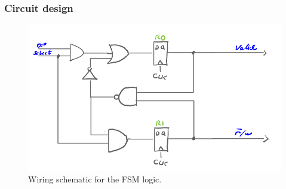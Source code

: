 \subsubsection{Circuit design}
\begin{figure}
    \centering
    \includegraphics[width=0.8\linewidth]{LaTeX_2/Figures/fsm_schematic.png}
    \caption{Wiring schematic for the FSM logic.}
    \label{fig:03:FSM_schematic}
\end{figure}


